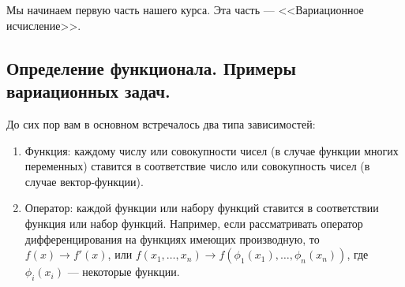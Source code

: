 	\chapter{}
\label{lecture1}
Мы начинаем первую часть нашего курса. Эта часть --- <<Вариационное исчисление>>.
\section{Определение функционала. Примеры вариационных задач.}
\label{lecture1section1}
До сих пор вам в основном встречалось два типа зависимостей:
\begin{enumerate}
	\item Функция: каждому числу или совокупности чисел (в случае функции многих переменных) ставится в соответствие число или совокупность чисел (в случае вектор-функции).
	
	\item Оператор: каждой функции или набору функций ставится в соответствии функция или набор функций. Например, если рассматривать оператор дифференцирования на функциях имеющих производную, то $f(x)\to f'(x)$, или $f(x_1,\ldots,x_n)\to f(\phi_1(x_1),\ldots,\phi_n(x_n))$, где \\ $\phi_i(x_i)$ --- некоторые функции.
	
\end{enumerate}

